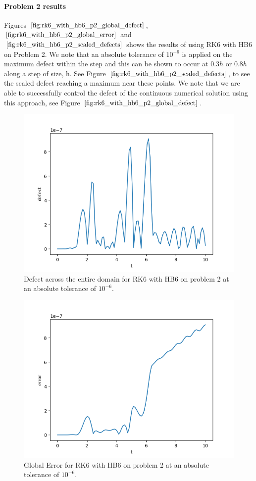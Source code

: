 \paragraph{Problem 2 results}
Figures $\ref{fig:rk6_with_hb6_p2_global_defect}$, $\ref{fig:rk6_with_hb6_p2_global_error}$ and $\ref{fig:rk6_with_hb6_p2_scaled_defects}$ shows the results of using RK6 with HB6 on Problem 2. We note that an absolute tolerance of $10^{-6}$ is applied on the maximum defect within the step and this can be shown to occur at $0.3h$ or $0.8h$ along a step of size, h. See Figure $\ref{fig:rk6_with_hb6_p2_scaled_defects}$, to see the scaled defect reaching a maximum near these points. We note that we are able to successfully control the defect of the continuous numerical solution using this approach, see Figure $\ref{fig:rk6_with_hb6_p2_global_defect}$. 

\begin{figure}[H]
\centering
\includegraphics[width=0.7\linewidth]{./figures/rk6_with_hb6_p2_global_defect}
\caption{Defect across the entire domain for RK6 with HB6 on problem 2 at an absolute tolerance of $10^{-6}$.}
\label{fig:rk6_with_hb6_p2_global_defect}
\end{figure}

\begin{figure}[H]
\centering
\includegraphics[width=0.7\linewidth]{./figures/rk6_with_hb6_p2_global_error}
\caption{Global Error for RK6 with HB6 on problem 2 at an absolute tolerance of $10^{-6}$.}
\label{fig:rk6_with_hb6_p2_global_error}
\end{figure}

